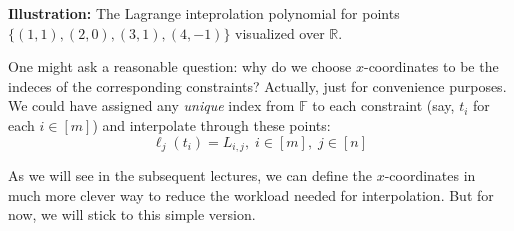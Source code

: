 \documentclass[../../book.tex]{subfiles}
\begin{document}
\begin{example}
    \begin{center}

        \textbf{Illustration:} The Lagrange inteprolation polynomial for points $\{(1,1), (2,0), (3,1), (4,-1)\}$ visualized over $\mathbb{R}$.
    \end{center}
\end{example}

\begin{remark}
    One might ask a reasonable question: why do we choose $x$-coordinates to be the
    indeces of the corresponding constraints? Actually, just for convenience
    purposes. We could have assigned any \textit{unique} index from $\mathbb{F}$
    to each constraint (say, $t_i$ for each $i \in [m]$) and interpolate through
    these points:
    \begin{equation*}
        \ell_j(t_i) = L_{i,j}, \; i \in [m], \; j \in [n]
    \end{equation*}

    As we will see in the subsequent lectures, we can define the $x$-coordinates
    in much more clever way to reduce the workload needed for interpolation. But
    for now, we will stick to this simple version.
\end{remark}
\end{document}
